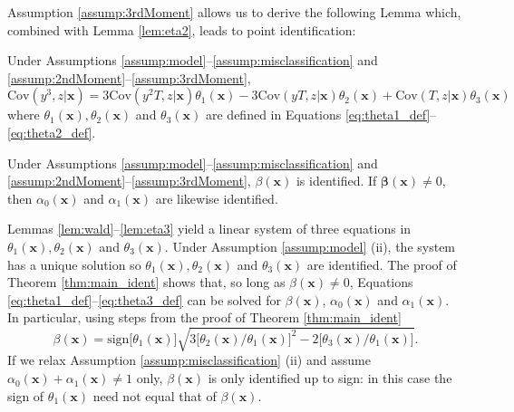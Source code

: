 Assumption \ref{assump:3rdMoment} allows us to derive the following Lemma which, combined with Lemma \ref{lem:eta2}, leads to point identification: 

\begin{lem}
  Under Assumptions \ref{assump:model}--\ref{assump:misclassification} and \ref{assump:2ndMoment}--\ref{assump:3rdMoment}, 
\[
    \mbox{Cov}(y^3,z|\mathbf{x}) = 3 \mbox{Cov}(y^2T,z|\mathbf{x}) \theta_1(\mathbf{x}) -3\mbox{Cov}(yT,z|\mathbf{x}) \theta_2(\mathbf{x}) + \mbox{Cov}(T,z|\mathbf{x}) \theta_3(\mathbf{x})
\]
where $\theta_1(\mathbf{x}),\theta_2(\mathbf{x})$ and $\theta_3(\mathbf{x})$ are defined in Equations \ref{eq:theta1_def}--\ref{eq:theta2_def}.
\label{lem:eta3}
\end{lem}

\begin{thm}
  Under Assumptions \ref{assump:model}--\ref{assump:misclassification} and \ref{assump:2ndMoment}--\ref{assump:3rdMoment}, $\beta(\mathbf{x})$ is identified.
  If $\mathbf{\beta}(\mathbf{x}) \neq 0$, then $\alpha_0(\mathbf{x})$ and $\alpha_1(\mathbf{x})$ are likewise identified.
  \label{thm:main_ident}
\end{thm}

Lemmas \ref{lem:wald}--\ref{lem:eta3} yield a linear system of three equations in $\theta_1(\mathbf{x}), \theta_2(\mathbf{x})$ and $\theta_3(\mathbf{x})$.
Under Assumption \ref{assump:model} (ii), the system has a unique solution so $\theta_1(\mathbf{x}), \theta_2(\mathbf{x})$ and $\theta_3(\mathbf{x})$ are identified.
The proof of Theorem \ref{thm:main_ident} shows that, so long as $\beta(\mathbf{x})\neq 0$, Equations \ref{eq:theta1_def}--\ref{eq:theta3_def} can be solved for $\beta(\mathbf{x})$, $\alpha_0(\mathbf{x})$ and $\alpha_1(\mathbf{x})$.
In particular, using steps from the proof of Theorem \ref{thm:main_ident}
\[
  \beta(\mathbf{x}) = \mbox{sign}\big[ \theta_1(\mathbf{x}) \big] \sqrt{3 \big[ \theta_2(\mathbf{x})/\theta_1(\mathbf{x}) \big]^2 - 2\big[\theta_3(\mathbf{x})/\theta_1(\mathbf{x})\big]}.
\]
If we relax Assumption \ref{assump:misclassification} (ii) and assume $\alpha_0(\mathbf{x}) + \alpha_1(\mathbf{x}) \neq 1$ only, $\beta(\mathbf{x})$ is only identified up to sign: in this case the sign of $\theta_1(\mathbf{x})$ need not equal that of $\beta(\mathbf{x})$.

